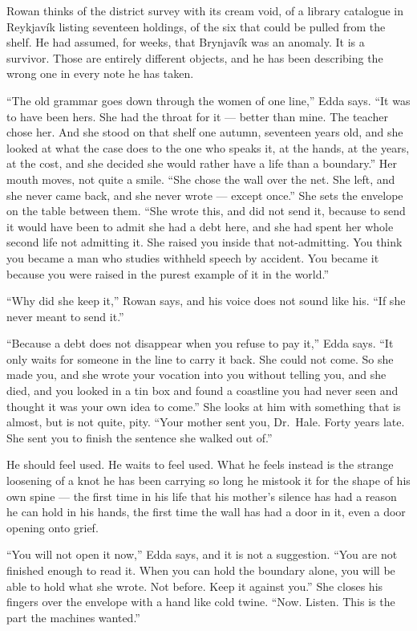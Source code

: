 \documentclass[11pt,oneside]{book}
\begin{document}
Rowan thinks of the district survey with its cream void, of a library
catalogue in Reykjavík listing seventeen holdings, of the six that could
be pulled from the shelf. He had assumed, for weeks, that Brynjavík was
an anomaly. It is a survivor. Those are entirely different objects, and
he has been describing the wrong one in every note he has taken.

``The old grammar goes down through the women of one line,'' Edda says.
``It was to have been hers. She had the throat for it --- better than
mine. The teacher chose her. And she stood on that shelf one autumn,
seventeen years old, and she looked at what the case does to the one who
speaks it, at the hands, at the years, at the cost, and she decided she
would rather have a life than a boundary.'' Her mouth moves, not quite a
smile. ``She chose the wall over the net. She left, and she never came
back, and she never wrote --- except once.'' She sets the envelope on
the table between them. ``She wrote this, and did not send it, because
to send it would have been to admit she had a debt here, and she had
spent her whole second life not admitting it. She raised you inside that
not-admitting. You think you became a man who studies withheld speech by
accident. You became it because you were raised in the purest example of
it in the world.''

``Why did she keep it,'' Rowan says, and his voice does not sound like
his. ``If she never meant to send it.''

``Because a debt does not disappear when you refuse to pay it,'' Edda
says. ``It only waits for someone in the line to carry it back. She
could not come. So she made you, and she wrote your vocation into you
without telling you, and she died, and you looked in a tin box and found
a coastline you had never seen and thought it was your own idea to
come.'' She looks at him with something that is almost, but is not
quite, pity. ``Your mother sent you, Dr.~Hale. Forty years late. She
sent you to finish the sentence she walked out of.''

He should feel used. He waits to feel used. What he feels instead is the
strange loosening of a knot he has been carrying so long he mistook it
for the shape of his own spine --- the first time in his life that his
mother's silence has had a reason he can hold in his hands, the first
time the wall has had a door in it, even a door opening onto grief.

``You will not open it now,'' Edda says, and it is not a suggestion.
``You are not finished enough to read it. When you can hold the boundary
alone, you will be able to hold what she wrote. Not before. Keep it
against you.'' She closes his fingers over the envelope with a hand like
cold twine. ``Now. Listen. This is the part the machines wanted.''
\end{document}
